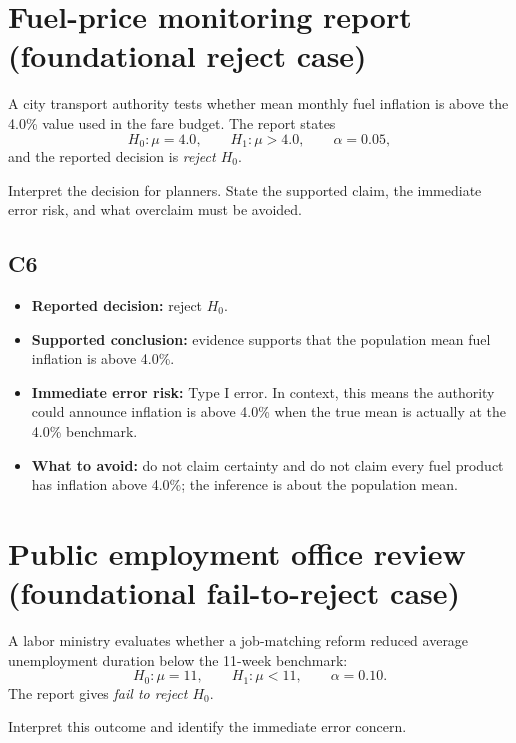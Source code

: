 	\section{Fuel-price monitoring report (foundational reject case)}
	A city transport authority tests whether mean monthly fuel inflation is above the 4.0\% value used in the fare budget. The report states
	\[
	H_0\colon \mu=4.0,\qquad H_1\colon \mu>4.0,\qquad \alpha=0.05,
	\]
	and the reported decision is \textit{reject \(H_0\)}.
	
	Interpret the decision for planners. State the supported claim, the immediate error risk, and what overclaim must be avoided.
	
	\begin{center}
	\end{center}
	
	\subsection*{C6}
	\begin{itemize}
		\item \textbf{Reported decision:} reject \(H_0\).
		\item \textbf{Supported conclusion:} evidence supports that the population mean fuel inflation is above 4.0\%.
		\item \textbf{Immediate error risk:} Type I error. In context, this means the authority could announce inflation is above 4.0\% when the true mean is actually at the 4.0\% benchmark.
		\item \textbf{What to avoid:} do not claim certainty and do not claim every fuel product has inflation above 4.0\%; the inference is about the population mean.
	\end{itemize}
	
	\section{Public employment office review (foundational fail-to-reject case)}
	A labor ministry evaluates whether a job-matching reform reduced average unemployment duration below the 11-week benchmark:
	\[
	H_0\colon \mu=11,\qquad H_1\colon \mu<11,\qquad \alpha=0.10.
	\]
	The report gives \textit{fail to reject \(H_0\)}.
	
	Interpret this outcome and identify the immediate error concern.
	
	\begin{center}
	\end{center}
	
